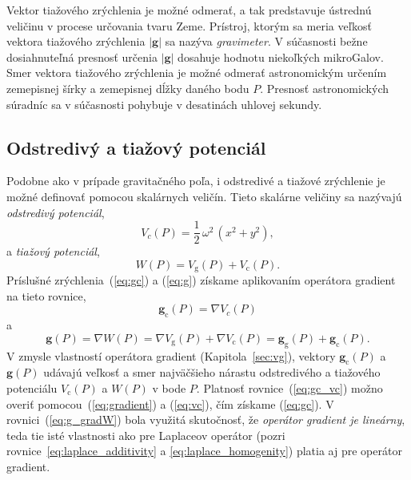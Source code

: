 \documentclass[a4paper, 12pt]{book}
\newcommand{\gidx}{\mathrm g}
\newcommand{\cidx}{\mathrm c}
\let\vec\mathbf
\begin{document}
Vektor tiažového zrýchlenia je možné odmerať, a tak predstavuje ústrednú 
veličinu v procese určovania tvaru Zeme.  Prístroj, ktorým sa meria veľkosť 
vektora tiažového zrýchlenia $| \vec g |$ sa nazýva \emph{gravimeter}.  
V súčasnosti bežne dosiahnuteľná presnosť určenia $| \vec g |$ dosahuje hodnotu 
niekoľkých mikroGalov.  Smer vektora tiažového zrýchlenia je možné odmerať 
astronomickým určením zemepisnej šírky a zemepisnej dĺžky daného bodu $P$.  
Presnosť astronomických súradníc sa v súčasnosti pohybuje v desatinách uhlovej 
sekundy.






\subsection{Odstredivý a tiažový potenciál}

Podobne ako v prípade gravitačného poľa, i odstredivé a tiažové zrýchlenie je 
možné definovať pomocou skalárnych veličín.  Tieto skalárne veličiny sa 
nazývajú \emph{odstredivý potenciál},
%
\begin{equation}
\label{eq:vc}
V_c(P) = \frac{1}{2} \, \omega^2 \, (x^2 + y^2){,}
\end{equation}
%
a \emph{tiažový potenciál},
%
\begin{equation}
\label{eq:w}
W(P) = V_\gidx(P) + V_\cidx(P){.}
\end{equation}
%
Príslušné zrýchlenia~(\ref{eq:gc}) a (\ref{eq:g}) získame aplikovaním operátora 
gradient na tieto rovnice,
%
\begin{equation}
\label{eq:gc_vc}
\vec g_\cidx(P) = \nabla V_c(P)
\end{equation}
%
a
%
\begin{equation}
\label{eq:g_gradW}
\vec g(P) = \nabla W(P) = \nabla V_\gidx(P) + \nabla V_\cidx(P) = \vec 
g_\gidx(P) + \vec g_\cidx(P){.}
\end{equation}
%
V zmysle vlastností operátora gradient (Kapitola~\ref{sec:vg}), vektory $\vec 
g_\cidx(P)$ a $\vec g(P)$ udávajú veľkosť a smer najväčšieho nárastu 
odstredivého a tiažového potenciálu $V_\cidx(P)$ a $W(P)$ v bode $P$.  Platnosť 
rovnice~(\ref{eq:gc_vc}) možno overiť pomocou~(\ref{eq:gradient}) 
a (\ref{eq:vc}), čím získame (\ref{eq:gc}).  V rovnici~(\ref{eq:g_gradW}) bola 
využitá skutočnosť, že \emph{operátor gradient je lineárny}, teda tie isté 
vlastnosti ako pre Laplaceov operátor (pozri 
rovnice~\ref{eq:laplace_additivity} a \ref{eq:laplace_homogenity}) platia aj 
pre operátor gradient.
\end{document}
